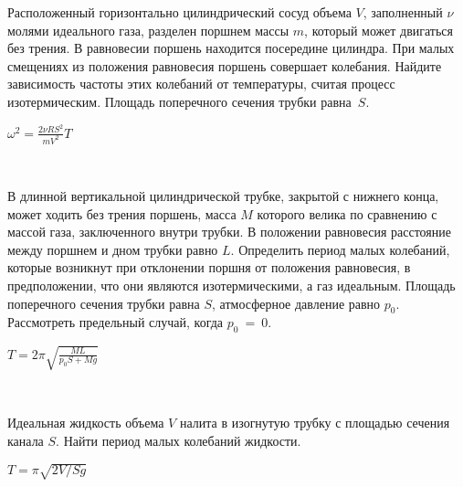 \begin{ex} Расположенный горизонтально цилиндрический сосуд объема $V$, заполненный $\nu$ молями идеального газа, 
разделен поршнем массы $m$, который может двигаться без трения. В равновесии поршень находится посередине цилиндра. 
При малых смещениях из положения равновесия поршень совершает колебания. Найдите зависимость частоты этих колебаний от температуры, 
считая процесс изотермическим. Площадь поперечного сечения трубки равна~$S$.
\begin{ans}
$\omega^2=\frac{2\nu R S^2}{mV^2}T$
\end{ans}
\end{ex}

\begin{samepage}
\begin{ex}
\hspace{0pt} \\
\begin{minipage}{.65\textwidth} 
В длинной вертикальной цилиндрической трубке, закрытой с нижнего конца, может ходить без трения поршень, 
масса $M$ которого велика по сравнению с массой газа, заключенного внутри трубки. В положении равновесия расстояние между поршнем и дном трубки равно $L$. 
Определить период малых колебаний, которые возникнут при отклонении поршня от положения равновесия, в предположении, что они являются изотермическими, 
а газ идеальным. Площадь поперечного сечения трубки равна $S$, атмосферное давление равно $p_0$. Рассмотреть предельный случай, когда $p_0$~=~0.
\end{minipage}
\begin{minipage}{.35\textwidth}
\centering

\end{minipage}
\begin{ans}
$T=2\pi\sqrt{\frac{ML}{p_0S + Mg}}$
\end{ans}
\end{ex}
\end{samepage}

\begin{ex}
\hspace{0pt} \\
\begin{minipage}{.65\textwidth} 
Идеальная жидкость объема $V$ налита в изогнутую трубку с площадью сечения канала $S$. Найти период малых колебаний жидкости.
\end{minipage}
\begin{minipage}{.35\textwidth}
\centering

\end{minipage}
\begin{ans}
$T=\pi \sqrt{2V/Sg}$
\end{ans}
\end{ex}

